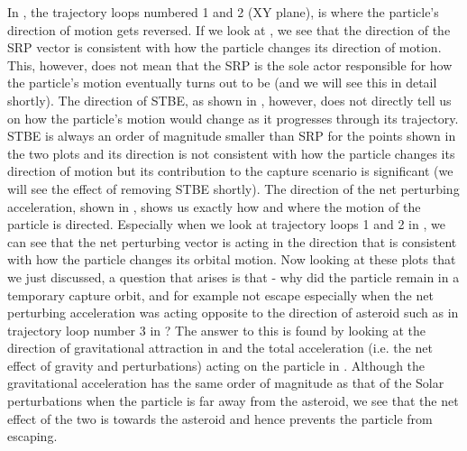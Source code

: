 In , the trajectory loops numbered 1 and 2 (XY plane), is where the particle's direction of motion gets reversed. If we look at , we see that the direction of the \gls{SRP} vector is consistent with how the particle changes its direction of motion. This, however, does not mean that the \gls{SRP} is the sole actor responsible for how the particle's motion eventually turns out to be (and we will see this in detail shortly). The direction of \gls{STBE}, as shown in , however, does not directly tell us on how the particle's motion would change as it progresses through its trajectory. \gls{STBE} is always an order of magnitude smaller than \gls{SRP} for the points shown in the two plots and its direction is not consistent with how the particle changes its direction of motion but its contribution to the capture scenario is significant (we will see the effect of removing \gls{STBE} shortly). The direction of the net perturbing acceleration, shown in , shows us exactly how and where the motion of the particle is directed. Especially when we look at trajectory loops 1 and 2 in , we can see that the net perturbing vector is acting in the direction that is consistent with how the particle changes its orbital motion. Now looking at these plots that we just discussed, a question that arises is that - why did the particle remain in a temporary capture orbit, and for example not escape especially when the net perturbing acceleration was acting opposite to the direction of asteroid such as in trajectory loop number 3 in ? The answer to this is found by looking at the direction of gravitational attraction in  and the total acceleration (i.e. the net effect of gravity and perturbations) acting on the particle in . Although the gravitational acceleration has the same order of magnitude as that of the Solar perturbations when the particle is far away from the asteroid, we see that the net effect of the two is towards the asteroid and hence prevents the particle from escaping.
